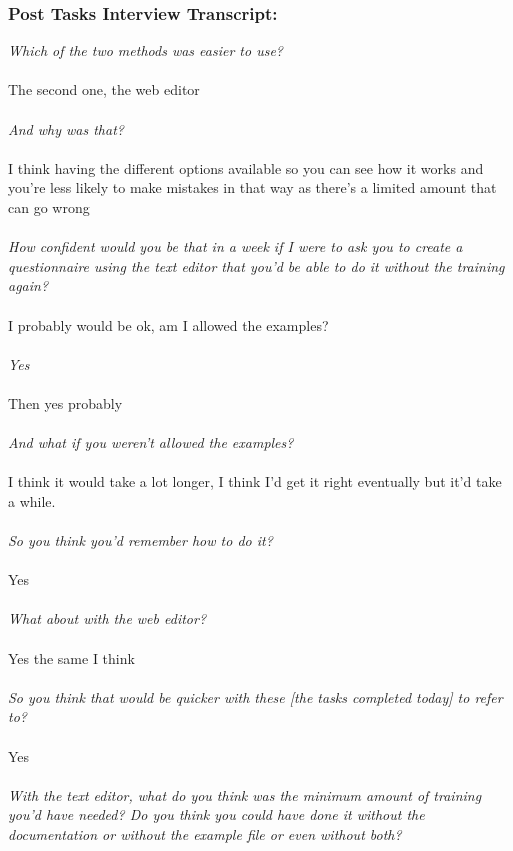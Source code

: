 \documentclass{report}
\begin{document}
\subsubsection*{Post Tasks Interview Transcript:}
\textit{Which of the two methods was easier to use?}
\\
\\
The second one, the web editor
\\
\\
\textit{And why was that?}
\\
\\
I think having the different options available so you can see how it works and you're less likely to make mistakes in that way as there's a limited amount that can go wrong
\\
\\
\textit{How confident would you be that in a week if I were to ask you to create a questionnaire using the text editor that you'd be able to do it without the training again?}
\\
\\
I probably would be ok, am I allowed the examples?
\\
\\
\textit{Yes}
\\
\\
Then yes probably
\\
\\
\textit{And what if you weren't allowed the examples?}
\\
\\
I think it would take a lot longer, I think I'd get it right eventually but it'd take a while.
\\
\\
\textit{So you think you'd remember how to do it?}
\\
\\
Yes
\\
\\
\textit{What about with the web editor?}
\\
\\
Yes the same I think
\\
\\
\textit{So you think that would be quicker with these [the tasks completed today] to refer to? }
\\
\\
Yes
\\
\\
\textit{With the text editor, what do you think was the minimum amount of training you'd have needed?  Do you think you could have done it without the documentation or without the example file or even without both?}
\end{document}
